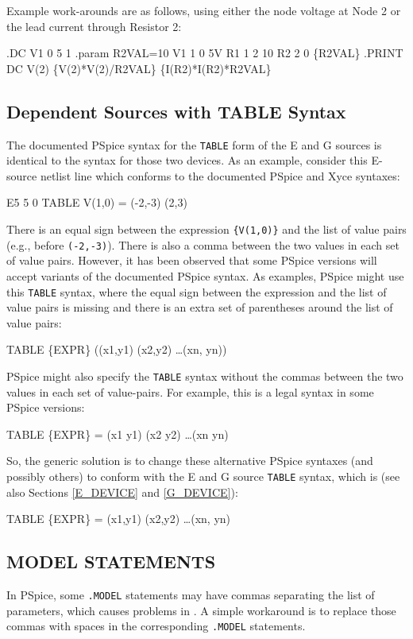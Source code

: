 Example work-arounds are as follows, using either the
node voltage at Node 2 or the lead current through Resistor 2:

\begin{vquote}
.DC V1 0 5 1
.param R2VAL=10
V1 1 0 5V
R1 1 2 10
R2 2 0 \{R2VAL\}
.PRINT DC V(2) \{V(2)*V(2)/R2VAL\} \{I(R2)*I(R2)*R2VAL\}
\end{vquote}

\subsection{Dependent Sources with TABLE Syntax}
\label{DS_TABLE_SYNTAX_DIFF}
The documented PSpice syntax for the \texttt{TABLE} form of the E and G sources
is identical to the \Xyce{} syntax for those two devices.  As an example, consider 
this E-source netlist line which conforms to the documented PSpice and Xyce 
syntaxes:
\begin{vquote}
E5  5 0 TABLE {V(1,0)} = (-2,-3) (2,3)
\end{vquote}
There is an equal sign between the expression \texttt{\{V(1,0)\}} and the list of
value pairs (e.g., before \texttt{(-2,-3)}).  There is also a comma between the two values
in each set of value pairs.  However, it has been observed that some PSpice versions 
will accept variants of the documented PSpice syntax.  As examples, PSpice might 
use this \texttt{TABLE} syntax, where the equal sign between the expression and the 
list of value pairs is missing and there is an extra set of parentheses around 
the list of value pairs:
\begin{vquote}
TABLE \{EXPR\} ((x1,y1) (x2,y2) \ldots (xn, yn))
\end{vquote}
PSpice might also specify the \texttt{TABLE} syntax without the commas between the 
two values in each set of value-pairs. For example, this is a legal syntax in some 
PSpice versions:
\begin{vquote}
TABLE \{EXPR\} = (x1 y1) (x2 y2) \ldots (xn yn)
\end{vquote}
So, the generic solution is to change these alternative PSpice syntaxes (and possibly 
others) to conform with the \Xyce{} E and G source \texttt{TABLE} syntax, which is
(see also Sections \ref{E_DEVICE} and \ref{G_DEVICE}):
\begin{vquote}
TABLE \{EXPR\} = (x1,y1) (x2,y2) \ldots (xn, yn)
\end{vquote}

\subsection{MODEL STATEMENTS}
\label{MODEL_STATEMENT_SYNTAX_DIFF}
In PSpice, some \texttt{.MODEL} statements may have commas separating the list
of parameters, which causes problems in \Xyce{}.  A simple workaround is to
replace those commas with spaces in the corresponding \Xyce{} \texttt{.MODEL}
statements.

